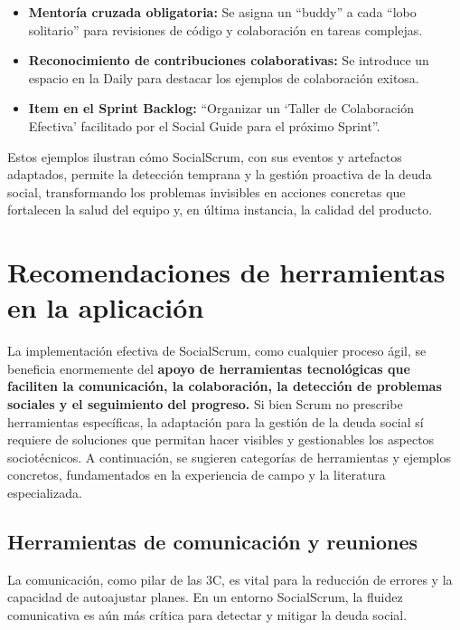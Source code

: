 \begin{itemize}
    \item \textbf{Mentoría cruzada obligatoria:} Se asigna un ``buddy'' a cada ``lobo solitario'' para revisiones de código y colaboración en tareas complejas.
    \item \textbf{Reconocimiento de contribuciones colaborativas:} Se introduce un espacio en la Daily para destacar los ejemplos de colaboración exitosa.
    \item \textbf{Item en el Sprint Backlog:} ``Organizar un `Taller de Colaboración Efectiva' facilitado por el Social Guide para el próximo Sprint''.
\end{itemize}

Estos ejemplos ilustran cómo SocialScrum, con sus eventos y artefactos adaptados, permite la detección temprana y la gestión proactiva de la deuda social, transformando los problemas invisibles en acciones concretas que fortalecen la salud del equipo y, en última instancia, la calidad del producto.

\section{Recomendaciones de herramientas en la aplicación}
La implementación efectiva de SocialScrum, como cualquier proceso ágil, se beneficia enormemente del \textbf{apoyo de herramientas tecnológicas que faciliten la comunicación, la colaboración, la detección de problemas sociales y el seguimiento del progreso.} Si bien Scrum no prescribe herramientas específicas, la adaptación para la gestión de la deuda social sí requiere de soluciones que permitan hacer visibles y gestionables los aspectos sociotécnicos. A continuación, se sugieren categorías de herramientas y ejemplos concretos, fundamentados en la experiencia de campo y la literatura especializada.

\subsection{Herramientas de comunicación y reuniones}
La comunicación, como pilar de las 3C, es vital para la reducción de errores y la capacidad de autoajustar planes. En un entorno SocialScrum, la fluidez comunicativa es aún más crítica para detectar y mitigar la deuda social.

